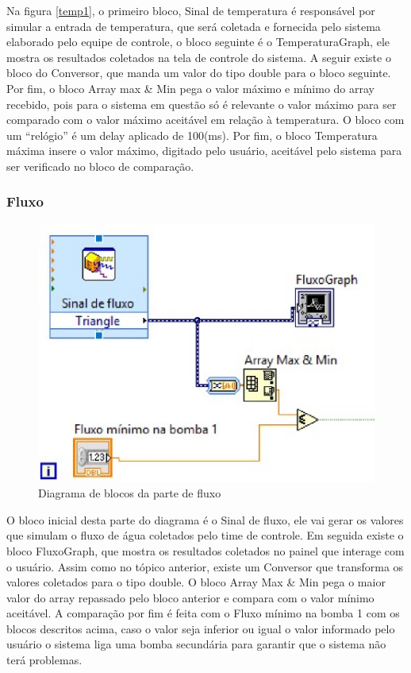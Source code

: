  Na figura \ref{temp1}, o primeiro bloco, Sinal de temperatura é responsável por simular a entrada de temperatura, que será coletada e fornecida pelo sistema elaborado pelo equipe de controle, o bloco seguinte é o TemperaturaGraph, ele mostra os resultados coletados na tela de controle do sistema. A seguir existe o bloco do Conversor, que manda um valor do tipo double para o bloco seguinte. Por fim, o bloco Array max \& Min pega o valor máximo e mínimo do array recebido, pois para o sistema em questão só é relevante o valor máximo para ser comparado com o valor máximo aceitável em relação à temperatura.
O bloco com um “relógio” é um delay aplicado de 100(ms). Por fim, o bloco Temperatura máxima insere o valor máximo, digitado pelo usuário, aceitável pelo sistema para ser verificado no bloco de comparação.

\subsubsection{Fluxo}


\begin{figure}[!htb]                                                               
    \centering                                                                      
    \includegraphics[scale=0.6, keepaspectratio=true]{figuras/detalhado/flux.eps} 
    \caption{Diagrama de blocos da parte de fluxo}
 \end{figure}

O bloco inicial desta parte do diagrama é o Sinal de fluxo, ele vai gerar os valores que simulam o fluxo de água coletados pelo time de controle. Em seguida existe o bloco FluxoGraph, que mostra os resultados coletados no painel que interage com o usuário.
    Assim como no tópico anterior, existe um Conversor que transforma os valores coletados para o tipo double. O bloco  Array Max \& Min pega o maior valor do array repassado pelo bloco anterior e compara com o valor mínimo aceitável.
    A comparação por fim é feita com o Fluxo mínimo na bomba 1 com os blocos descritos acima, caso o valor seja inferior ou igual o valor informado pelo usuário o sistema liga uma bomba secundária para garantir que o sistema não terá problemas.

